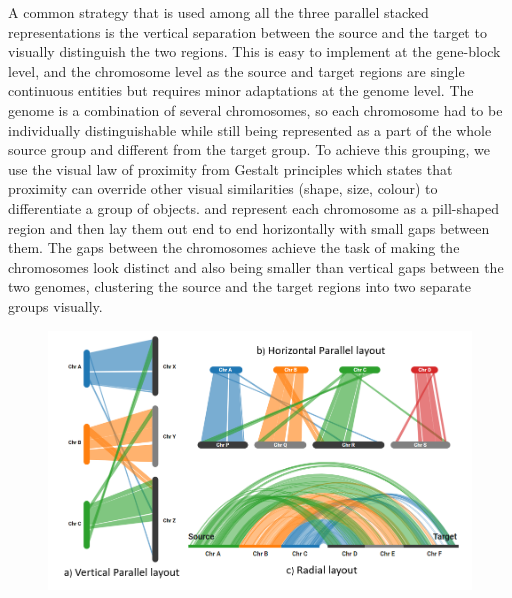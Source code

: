 A common strategy that is used among all the three parallel stacked representations is the vertical separation between the source and the target to visually distinguish the two regions. This is easy to implement at the gene-block level, and the chromosome level as the source and target regions are single continuous entities but requires minor adaptations at the genome level. The genome is a combination of several chromosomes, so each chromosome had to be individually distinguishable while still being represented as a part of the whole source group and different from the target group. To achieve this grouping, we use the visual law of proximity from Gestalt principles \cite{wertheimer1923untersuchungen} which states that proximity can override other visual similarities (shape, size, colour) to differentiate a group of objects. and represent each chromosome as a pill-shaped region and then lay them out end to end horizontally with small gaps between them. The gaps between the chromosomes achieve the task of making the chromosomes look distinct and also being smaller than vertical gaps between the two genomes, clustering the source and the target regions into two separate groups visually.

\begin{figure}
  \centering
  \includegraphics[width=.85\linewidth]{images/ch_4_layout.PNG}
  \label{fig:ch_4_layout}
\end{figure}


